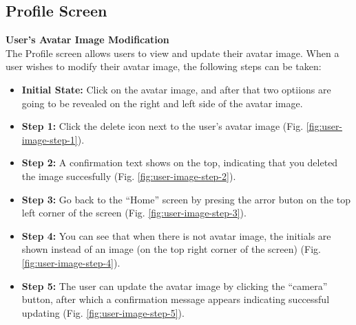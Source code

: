 \vspace{5mm}

\subsection{Profile Screen}

\noindent \textbf{User's Avatar Image Modification} \\
The Profile screen allows users to view and update their avatar image. When a user wishes to modify their avatar image, the following steps can be taken:

\begin{itemize}
    \item \textbf{Initial State:} Click on the avatar image, and after that two optiions are going to be revealed on the right and left side of the avatar image.
    \item \textbf{Step 1:} Click the delete icon next to the user's avatar image (Fig. \ref{fig:user-image-step-1}).
    \item \textbf{Step 2:} A confirmation text shows on the top, indicating that you deleted the image succesfully (Fig. \ref{fig:user-image-step-2}).
    \item \textbf{Step 3:} Go back to the ``Home'' screen by presing the arror buton on the top left corner of the screen (Fig. \ref{fig:user-image-step-3}).
    \item \textbf{Step 4:} You can see that when there is not avatar image, the initials are shown instead of an image (on the top right corner of the screen) (Fig. \ref{fig:user-image-step-4}).
    \item \textbf{Step 5:} The user can update the avatar image by clicking the ``camera'' button, after which a confirmation message appears indicating successful updating (Fig. \ref{fig:user-image-step-5}).
\end{itemize}

\vspace{5mm}

